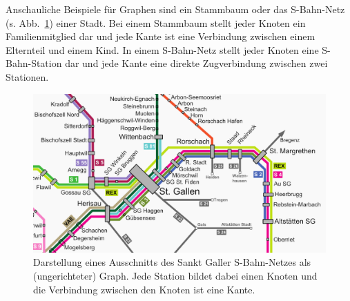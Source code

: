 \begin{mbsp}
Anschauliche Beispiele für Graphen sind ein Stammbaum oder das S-Bahn-Netz (s. Abb.~\ref{fig:sbahn}) einer Stadt. 
Bei einem Stammbaum stellt jeder Knoten ein Familienmitglied dar und jede Kante ist eine Verbindung zwischen einem Elternteil und einem Kind. 
In einem S-Bahn-Netz stellt jeder Knoten eine S-Bahn-Station dar und jede Kante eine direkte Zugverbindung zwischen zwei Stationen.
\end{mbsp}
%
%

\begin{figure}[htb]
\begin{center}

\includegraphics[width=.67\textwidth]{../fig/sbahn_netz_ausschnitt.png}
\caption{Darstellung eines Ausschnitts des Sankt Galler S-Bahn-Netzes als (ungerichteter) Graph.
Jede Station bildet dabei einen Knoten und die Verbindung zwischen den Knoten ist eine Kante.
}

\label{fig:sbahn}
\end{center}
\end{figure}


